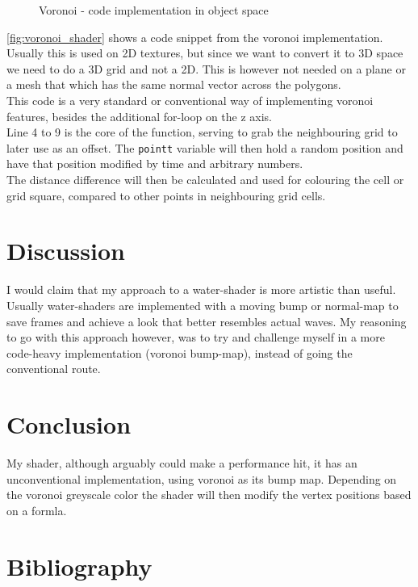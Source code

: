 \documentclass{article}
\begin{document}
\begin{figure}[H]
    \centering
    
    \caption{Voronoi - code implementation in object space}
    \label{fig:voronoi_shader}
\end{figure}
\autoref{fig:voronoi_shader} shows a code snippet from the voronoi implementation. Usually this is used on 2D textures, but since we want to convert it to 3D space we need to do a 3D grid and not a 2D. This is however not needed on a plane or a mesh that which has the same normal vector across the polygons.\\
This code is a very standard or conventional way of implementing voronoi features, besides the additional for-loop on the z axis.\\

Line 4 to 9 is the core of the function, serving to grab the neighbouring grid to later use as an offset. The \texttt{pointt} variable will then hold a random position and have that position modified by time and arbitrary numbers.\\The distance difference will then be calculated and used for colouring the cell or grid square, compared to other points in neighbouring grid cells.

\section{Discussion}
\label{sec:discussion}
I would claim that my approach to a water-shader is more artistic than useful. Usually water-shaders are implemented with a moving bump or normal-map to save frames and achieve a look that better resembles actual waves. My reasoning to go with this approach however, was to try and challenge myself in a more code-heavy implementation (voronoi bump-map), instead of going the conventional route.

\section{Conclusion}
\label{sec:conclusion}
My shader, although arguably could make a performance hit, it has an unconventional implementation, using voronoi as its bump map. Depending on the voronoi greyscale color the shader will then modify the vertex positions based on a formla.


\newpage
\section{Bibliography}
\printbibliography
\end{document}
